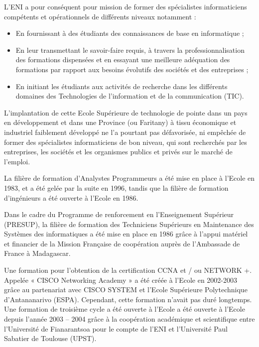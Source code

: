 \documentclass[12pt]{report}
\begin{document}
				           \begin{center}
						\begin{minipage}{\textwidth}
								\hspace{15pt} L’ENI a pour conséquent pour mission de former des spécialistes informaticiens compétents et opérationnels de différents niveaux notamment : 
				
								\begin{itemize}
									\item En fournissant à des étudiants des connaissances de base en informatique ;
									\item En leur transmettant le savoir-faire requis, à travers la professionnalisation des formations dispensées et en essayant une meilleure adéquation des formations par rapport aux besoins évolutifs des sociétés et des entreprises ;
									\item En initiant les étudiants aux activités de recherche dans les différents domaines des Technologies de l’information et de la communication (TIC).\\
								\end{itemize}
						\end{minipage}
					\end{center}

				L’implantation de cette Ecole Supérieure de technologie de pointe dans un pays en développement et dans une Province (ou Faritany) à tissu économique et industriel faiblement développé ne l’a pourtant pas défavorisée, ni empêchée de former des spécialistes informaticiens de bon niveau, qui sont recherchés par les entreprises, les sociétés et les organismes publics et privés sur le marché de l’emploi.

				La filière de formation d’Analystes Programmeurs a été mise en place à l’Ecole en 1983, et a été gelée par la suite en 1996, tandis que la filière de formation d’ingénieurs a été ouverte à l’Ecole en 1986.
				
				Dans le cadre du Programme de renforcement en l’Enseignement Supérieur (PRESUP), la filière de formation des Techniciens Supérieurs en Maintenance des Systèmes des informatiques a été mise en place en 1986 grâce à l’appui matériel et financier de la Mission Française de coopération auprès de l’Ambassade de France à Madagascar.

				Une formation pour l’obtention de la certification CCNA et / ou NETWORK +. Appelée « CISCO Networking Academy » a été créée à l’Ecole en 2002-2003 grâce au partenariat avec CISCO SYSTEM et l’Ecole Supérieure Polytechnique d’Antananarivo (ESPA). Cependant, cette formation n’avait pas duré longtemps. Une formation de troisième cycle a été ouverte à l’Ecole a été ouverte à l’Ecole depuis l’année 2003 – 2004 grâce à la coopération académique et scientifique entre l’Université de Fianarantsoa pour le compte de l’ENI et l’Université Paul Sabatier de Toulouse (UPST).
				
\end{document}
